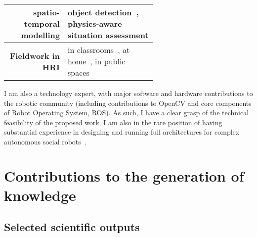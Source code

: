 \begin{table}[h!]
\begin{tabular}{rp{0.6\linewidth}}
        spatio-temporal modelling & \small object
        detection~\cite{wallbridge2017qualitative}, physics-aware situation
        assessment\cite{lemaignan2018underworlds,sallami2019simulation} \\
        \midrule
        \textbf{Fieldwork in HRI} & \small in
        classrooms~\cite{hood2015when, lemaignan2016learning, jacq2016building,
        baxter2015wider,kennedy2016cautious,senft2018robots}, at
        home~\cite{mondada2015ranger}, in public spaces~\cite{winkle2020insitu}\\
        \bottomrule
    \end{tabular}
    \label{pi-expertise}
\end{table}

I am also a technology expert, with major software and hardware contributions to
the robotic community (including contributions to OpenCV and core components of
Robot Operating System, ROS). As such, I have a clear grasp of the technical
feasibility of the proposed work. I am also in the rare position of having
substantial experience in designing and running full architectures for complex
autonomous social
robots~\cite{lemaignan2017artificial,winkle2020insitu}.



\section{Contributions to the generation of knowledge}

\subsection{Selected scientific outputs}

